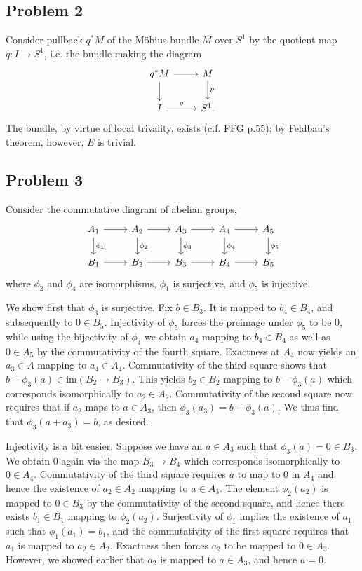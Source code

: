 \documentclass{../mathnotes}
\begin{document}
\subsection*{Problem 2}
Consider pullback $q^*M$ of the M\"obius bundle $M$ over $S^1$ by the quotient map $q:I\to S^1$,
i.e. the bundle making the diagram
\begin{equation*}
    \begin{tikzcd}
        q^*M\ar{r}\ar{d} & M\ar{d}{p}\\
        I\ar{r}{q} & S^1.
    \end{tikzcd}
\end{equation*}
The bundle, by virtue of local trivality, exists (c.f. FFG p.55); by Feldbau's theorem, however,
$E$ is trivial.

\subsection*{Problem 3}
Consider the commutative diagram of abelian groups,
\begin{equation*}
    \begin{tikzcd}
        A_1\ar{r}\ar{d}{\phi_1} & A_2\ar{r}\ar{d}{\phi_2} & A_3\ar{r}\ar{d}{\phi_3} & A_4\ar{r}\ar{d}{\phi_4} & A_5\ar{d}{\phi_5}\\
        B_1\ar{r} & B_2\ar{r} & B_3\ar{r} & B_4\ar{r} & B_5
    \end{tikzcd}
\end{equation*}
where $\phi_2$ and $\phi_4$ are isomorphisms, $\phi_1$ is surjective, and $\phi_5$ is injective.

We show first that $\phi_3$ is surjective. Fix $b\in B_3$. It is mapped to $b_4\in B_4$, and
subsequently to $0\in B_5$. Injectivity of $\phi_5$ forces the preimage under $\phi_5$ to be 0,
while using the bijectivity of $\phi_4$ we obtain $a_4$ mapping to $b_4\in B_4$ as well as
$0\in A_5$ by the commutativity of the fourth square. Exactness at $A_4$ now yields an $a_3\in A$
mapping to $a_4\in A_4$. Commutativity of the third square shows that $b-\phi_3(a)\in\text{im}(B_2\to B_3)$.
This yields $b_2\in B_2$ mapping to $b-\phi_3(a)$ which corresponds isomorphically to $a_2\in A_2$.
Commutativity of the second square now requires that if $a_2$ maps to $a\in A_3$, then
$\phi_3(a_3)=b-\phi_3(a)$. We thus find that $\phi_3(a+a_3)=b$, as desired.

Injectivity is a bit easier. Suppose we have an $a\in A_3$ such that $\phi_3(a)=0\in B_3$.
We obtain 0 again via the map $B_3\to B_4$ which corresponds isomorphically to $0\in A_4$.
Commutativity of the third square requires $a$ to map to $0$ in $A_4$ and hence the existence of
$a_2\in A_2$ mapping to $a\in A_3$. The element $\phi_2(a_2)$ is mapped to $0\in B_3$ by
the commutativity of the second square, and hence there exists $b_1\in B_1$ mapping to $\phi_2(a_2)$.
Surjectivity of $\phi_1$ implies the existence of $a_1$ such that $\phi_1(a_1)=b_1$, and the 
commutativity of the first square requires that $a_1$ is mapped to $a_2\in A_2$. Exactness then
forces $a_2$ to be mapped to $0\in A_3$. However, we showed earlier that $a_2$ is mapped to $a\in A_3$,
and hence $a=0$.
\end{document}
